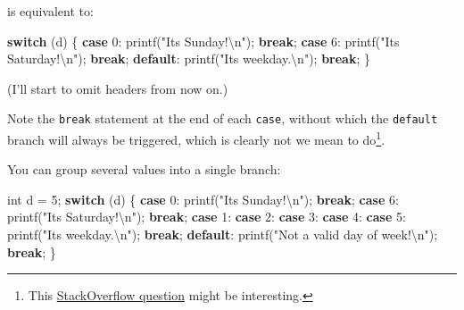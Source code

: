 \documentclass[
]{book}
\newenvironment{Shaded}{\begin{snugshade}}{\end{snugshade}}
\newcommand{\ControlFlowTok}[1]{\textcolor[rgb]{0.13,0.29,0.53}{\textbf{#1}}}
\newcommand{\DataTypeTok}[1]{\textcolor[rgb]{0.13,0.29,0.53}{#1}}
\newcommand{\DecValTok}[1]{\textcolor[rgb]{0.00,0.00,0.81}{#1}}
\newcommand{\NormalTok}[1]{#1}
\newcommand{\SpecialCharTok}[1]{\textcolor[rgb]{0.00,0.00,0.00}{#1}}
\newcommand{\StringTok}[1]{\textcolor[rgb]{0.31,0.60,0.02}{#1}}
\begin{document}
is equivalent to:

\begin{Shaded}
\begin{Highlighting}[]
\ControlFlowTok{switch}\NormalTok{ (d)}
\NormalTok{\{}
\ControlFlowTok{case} \DecValTok{0}\NormalTok{:}
\NormalTok{    printf(}\StringTok{"It\textquotesingle{}s Sunday!}\SpecialCharTok{\textbackslash{}n}\StringTok{"}\NormalTok{);}
    \ControlFlowTok{break}\NormalTok{;}
\ControlFlowTok{case} \DecValTok{6}\NormalTok{:}
\NormalTok{    printf(}\StringTok{"It\textquotesingle{}s Saturday!}\SpecialCharTok{\textbackslash{}n}\StringTok{"}\NormalTok{);}
    \ControlFlowTok{break}\NormalTok{;}
\ControlFlowTok{default}\NormalTok{:}
\NormalTok{    printf(}\StringTok{"It\textquotesingle{}s weekday.}\SpecialCharTok{\textbackslash{}n}\StringTok{"}\NormalTok{);}
    \ControlFlowTok{break}\NormalTok{;}
\NormalTok{\}}
\end{Highlighting}
\end{Shaded}

(I'll start to omit headers from now on.)

Note the \texttt{break} statement at the end of each \texttt{case}, without which the \texttt{default} branch will always be triggered, which is clearly not we mean to do\footnote{This \href{https://stackoverflow.com/questions/252489/why-was-the-switch-statement-designed-to-need-a-break}{StackOverflow question} might be interesting.}.

You can group several values into a single branch:

\begin{Shaded}
\begin{Highlighting}[]
\DataTypeTok{int}\NormalTok{ d = }\DecValTok{5}\NormalTok{;}
\ControlFlowTok{switch}\NormalTok{ (d)}
\NormalTok{\{}
\ControlFlowTok{case} \DecValTok{0}\NormalTok{:}
\NormalTok{    printf(}\StringTok{"It\textquotesingle{}s Sunday!}\SpecialCharTok{\textbackslash{}n}\StringTok{"}\NormalTok{);}
    \ControlFlowTok{break}\NormalTok{;}
\ControlFlowTok{case} \DecValTok{6}\NormalTok{:}
\NormalTok{    printf(}\StringTok{"It\textquotesingle{}s Saturday!}\SpecialCharTok{\textbackslash{}n}\StringTok{"}\NormalTok{);}
    \ControlFlowTok{break}\NormalTok{;}
\ControlFlowTok{case} \DecValTok{1}\NormalTok{:}
\ControlFlowTok{case} \DecValTok{2}\NormalTok{:}
\ControlFlowTok{case} \DecValTok{3}\NormalTok{:}
\ControlFlowTok{case} \DecValTok{4}\NormalTok{:}
\ControlFlowTok{case} \DecValTok{5}\NormalTok{:}
\NormalTok{    printf(}\StringTok{"It\textquotesingle{}s weekday.}\SpecialCharTok{\textbackslash{}n}\StringTok{"}\NormalTok{);}
    \ControlFlowTok{break}\NormalTok{;}
\ControlFlowTok{default}\NormalTok{:}
\NormalTok{    printf(}\StringTok{"Not a valid day of week!}\SpecialCharTok{\textbackslash{}n}\StringTok{"}\NormalTok{);}
    \ControlFlowTok{break}\NormalTok{;}
\NormalTok{\}}
\end{Highlighting}
\end{Shaded}
\end{document}
